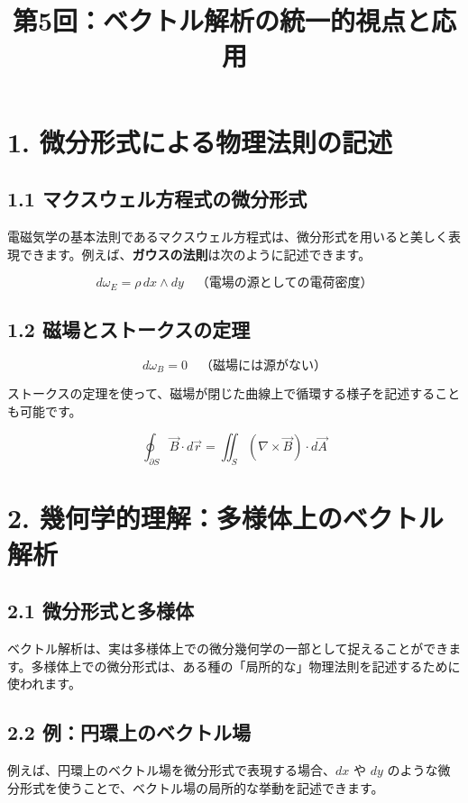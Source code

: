 \documentclass[a4j,11pt]{jsarticle}
\title{第5回：ベクトル解析の統一的視点と応用}
\author{}
\date{}
\begin{document}
\maketitle

\section*{1. 微分形式による物理法則の記述}

\subsection*{1.1 マクスウェル方程式の微分形式}
電磁気学の基本法則であるマクスウェル方程式は、微分形式を用いると美しく表現できます。例えば、\textbf{ガウスの法則}は次のように記述できます。

\[
d\omega_E = \rho \, dx \wedge dy \quad \text{（電場の源としての電荷密度）}
\]

\subsection*{1.2 磁場とストークスの定理}
\[
d\omega_B = 0 \quad \text{（磁場には源がない）}
\]

ストークスの定理を使って、磁場が閉じた曲線上で循環する様子を記述することも可能です。

\[
\oint_{\partial S} \vec{B} \cdot d\vec{r} = \iint_S (\nabla \times \vec{B}) \cdot d\vec{A}
\]

\section*{2. 幾何学的理解：多様体上のベクトル解析}

\subsection*{2.1 微分形式と多様体}
ベクトル解析は、実は多様体上での微分幾何学の一部として捉えることができます。多様体上での微分形式は、ある種の「局所的な」物理法則を記述するために使われます。

\subsection*{2.2 例：円環上のベクトル場}
例えば、円環上のベクトル場を微分形式で表現する場合、$dx$ や $dy$ のような微分形式を使うことで、ベクトル場の局所的な挙動を記述できます。

\begin{center}
\end{center}
\end{document}
